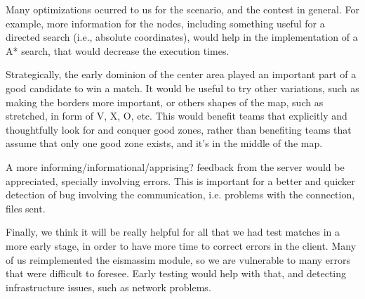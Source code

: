 \documentclass{llncs2e/llncs}
\begin{document}
    Many optimizations ocurred to us for the scenario, and the contest in general. 
    For example, more information for the nodes, including something useful for a 
    directed search (i.e., absolute coordinates), would help in the implementation 
    of a A* search, that would decrease the execution times.

    Strategically, the early dominion of the center area played an important part 
    of a good candidate to win a match. It would be useful to try other 
    variations, such as making the borders more important, or others shapes of the 
    map, such as stretched, in form of V, X, O, etc. This would benefit teams that 
    explicitly and thoughtfully look for and conquer good zones, rather than 
    benefiting teams that assume that only one good zone exists, and it's in the 
    middle of the map.

    A more informing/informational/apprising? feedback from the server would be 
    appreciated, specially involving errors. This is important for a better and 
    quicker detection of bug involving the communication, i.e. problems with the 
    connection, files sent.

    Finally, we think it will be really helpful for all that we had test matches 
    in a more early stage, in order to have more time to correct errors in the 
    client. Many of us reimplemented the eismassim module, so we are vulnerable to 
    many errors that were difficult to foresee. Early testing would help with 
    that, and detecting infrastructure issues, such as network problems.
\end{document}
